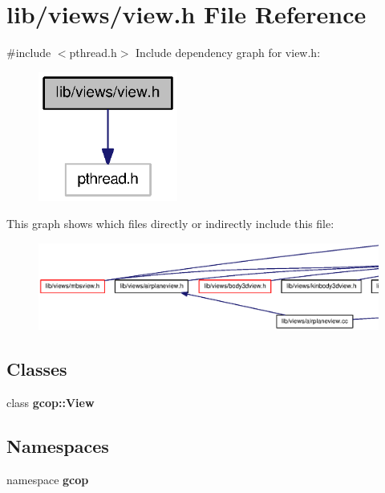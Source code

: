 \section{lib/views/view.h \-File \-Reference}
\label{view_8h}
{\ttfamily \#include $<$pthread.\-h$>$}\*
\-Include dependency graph for view.\-h\-:
\nopagebreak
\begin{figure}[H]
\begin{center}
\leavevmode
\includegraphics[width=130pt]{view_8h__incl}
\end{center}
\end{figure}
\-This graph shows which files directly or indirectly include this file\-:
\nopagebreak
\begin{figure}[H]
\begin{center}
\leavevmode
\includegraphics[width=350pt]{view_8h__dep__incl}
\end{center}
\end{figure}
\subsection*{\-Classes}
\begin{DoxyCompactItemize}
\item 
class {\bf gcop\-::\-View}
\end{DoxyCompactItemize}
\subsection*{\-Namespaces}
\begin{DoxyCompactItemize}
\item 
namespace {\bf gcop}
\end{DoxyCompactItemize}
